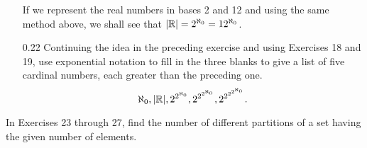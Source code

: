 \begin{enumerate}
      If we represent the real numbers in bases 2 and 12 and using the same
      method above, we shall see that $|\mathbb{R}| = 2^{\aleph_0} = 12^{\aleph_0}$.
      
      
   \item[0.22] Continuing the idea in the preceding exercise and using Exercises
               18 and 19, use exponential notation to fill in the three blanks
               to give a list of five cardinal numbers, each greater than the
               preceding one.
               $$\aleph_0, |\mathbb{R}|, 2^{2^{\aleph_0}}, 2^{2^{2^{\aleph_0}}},
                 2^{2^{2^{2^{\aleph_0}}}}.$$
\end{enumerate}


\noindent In Exercises 23 through 27, find the number of different partitions of
a set having the given number of elements.

